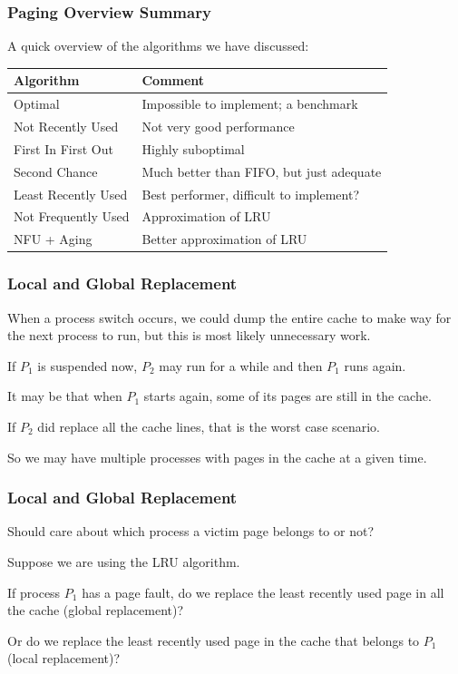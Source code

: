 \begin{frame}
\frametitle{Paging Overview Summary}

A quick overview of the algorithms we have discussed:

\begin{center}
\begin{tabular}{l|l}
	\textbf{Algorithm} & \textbf{Comment} \\ \hline
	Optimal & Impossible to implement; a benchmark\\
	Not Recently Used &  Not very good performance \\
	First In First Out & Highly suboptimal \\
	Second Chance & Much better than FIFO, but just adequate \\
	Least Recently Used & Best performer, difficult to implement? \\
	Not Frequently Used & Approximation of LRU \\
	NFU + Aging & Better approximation of LRU\\
\end{tabular}
\end{center}


\end{frame}

\begin{frame}
\frametitle{Local and Global Replacement}

When a process switch occurs, we could dump the entire cache to make way for the next process to run, but this is most likely unnecessary work. 

If $P_{1}$ is suspended now, $P_{2}$ may run for a while and then $P_{1}$ runs again.

It may be that when $P_{1}$ starts again, some of its pages are still in the cache.

If $P_{2}$ did replace all the cache lines, that is the worst case scenario. 

So we may have multiple processes with pages in the cache at a given time.

\end{frame}

\begin{frame}
\frametitle{Local and Global Replacement}

Should care about which process a victim page belongs to or not? 

Suppose we are using the LRU algorithm. 

If process $P_{1}$ has a page fault, do we replace the least recently used page in all the cache (global replacement)? 

Or do we replace the least recently used page in the cache that belongs to $P_{1}$ (local replacement)?


\end{frame}

